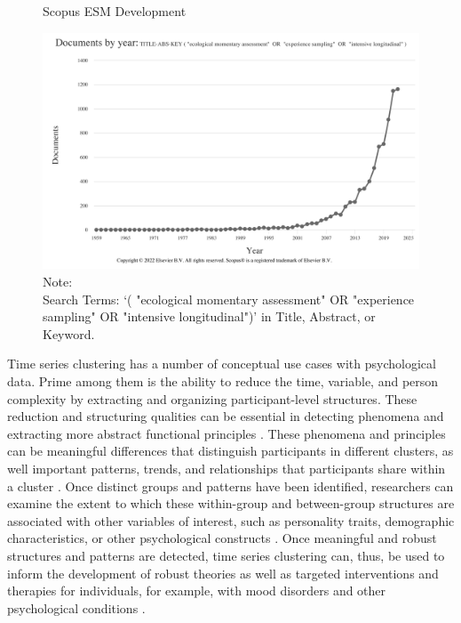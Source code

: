 \documentclass[man, 12pt, a4paper, mask, floatsintext]{apa7}
\theoremstyle{break}
\theoremstyle{plain}
\begin{document}
\begin{figure}[!hbtp] %
  \caption{Scopus ESM Development}
  \label{fig:ScopusEsm}
  \centering\includegraphics[width=\textwidth]{figures/Scopus-ESM-Development.png}
  \caption*{Note: \\
  Search Terms: `( "ecological momentary assessment"  OR  "experience sampling"  OR  "intensive longitudinal")' in Title, Abstract, or Keyword.}
\end{figure}

Time series clustering has a number of conceptual use cases with psychological data. Prime among them is the ability to reduce the time, variable, and person complexity by extracting and organizing participant-level structures. These reduction and structuring qualities can be essential in detecting phenomena and extracting more abstract functional principles \citep[][]{eronen2021a}. These phenomena and principles can be meaningful differences that distinguish participants in different clusters, as well important patterns, trends, and relationships that participants share within a cluster \citep[e.g.,][]{schrodt2000}. Once distinct groups and patterns have been identified, researchers can examine the extent to which these within-group and between-group structures are associated with other variables of interest, such as personality traits, demographic characteristics, or other psychological constructs \citep[e.g.,][]{monden2022}. Once meaningful and robust structures and patterns are detected, time series clustering can, thus, be used to inform the development of robust theories as well as targeted interventions and therapies for individuals, for example, with mood disorders and other psychological conditions \citep[e.g.,][]{borsboom2021, eronen2020}.
\end{document}
